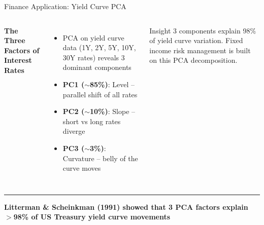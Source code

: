 \documentclass[8pt,aspectratio=169]{beamer}
\newcommand{\bottomnote}[1]{%
\vfill
\vspace{-2mm}
\textcolor{mllavender2}{\rule{\textwidth}{0.4pt}}
\vspace{1mm}
\footnotesize
\textbf{#1}
}
\newenvironment{compactlist}{%
  \begin{itemize}%
    \setlength{\itemsep}{2pt}%
    \setlength{\parskip}{0pt}%
    \setlength{\parsep}{0pt}%
}{%
  \end{itemize}%
}
\newcommand{\highlight}[1]{\textcolor{mlorange}{\textbf{#1}}}
\begin{document}
\begin{frame}[t]{Finance Application: Yield Curve PCA}
\begin{columns}[T]
\small
\textbf{The Three Factors of Interest Rates}
\begin{compactlist}
\item PCA on yield curve data (1Y, 2Y, 5Y, 10Y, 30Y rates) reveals 3 dominant components
\item \highlight{PC1 ($\sim$85\%)}: Level -- parallel shift of all rates
\item \highlight{PC2 ($\sim$10\%)}: Slope -- short vs long rates diverge
\item \highlight{PC3 ($\sim$3\%)}: Curvature -- belly of the curve moves
\end{compactlist}

\begin{block}{Insight}
\scriptsize 3 components explain 98\% of yield curve variation. Fixed income risk management is built on this PCA decomposition.
\end{block}

\vspace{2mm}
\footnotesize
{}
\end{columns}

\bottomnote{Litterman \& Scheinkman (1991) showed that 3 PCA factors explain $>$98\% of US Treasury yield curve movements}
\end{frame}
\end{document}
